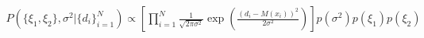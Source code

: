 \documentclass[10pt]{article}
\begin{document}
\begin{align*}P(\{\xi_1,\xi_2\},\sigma^2|\{d_i\}_{i=1}^N) \varpropto \left[ \prod_{i=1}^N \frac{1}{\sqrt{2\pi\sigma^2}} \exp \left( \frac{(d_i - M(x_i))^2}{2\sigma^2}\right) \right]p(\sigma^2)p(\xi_1)p(\xi_2)\end{align*}
\end{document}
